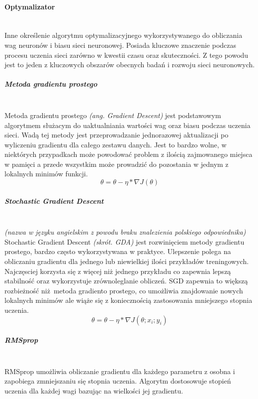 \paragraph{Optymalizator} \mbox{}\\
Inne określenie algorytmu optymalizacyjnego wykorzystywanego do obliczania wag neuronów
i biasu sieci neuronowej. Posiada kluczowe znaczenie podczas procesu uczenia sieci
zarówno w kwestii czasu oraz skuteczności. Z tego powodu jest to jeden z kluczowych
obszarów obecnych badań i rozwoju sieci neuronowych.

\subparagraph{Metoda gradientu prostego} \mbox{}\\
Metoda gradientu prostego \textit{(ang. Gradient Descent)} jest podstawowym algorytmem
służacym do uaktualniania wartości wag oraz biasu podczas uczenia sieci. Wadą tej
metody jest przeprowadzanie jednorazowej aktualizacji po wyliczeniu gradientu dla
całego zestawu danych. Jest to bardzo wolne, w niektórych przypadkach może powodować
problem z ilością zajmowanego miejsca w pamięci a przede wszystkim może prowadzić
do pozostania w jednym z lokalnych minimów funkcji.
\begin{equation}
\theta = \theta - \eta * \nabla J(\theta)
\end{equation}

\subparagraph{Stochastic Gradient Descent} \mbox{}\\
\textit{(nazwa w języku angielskim z powodu braku znalezienia polskiego odpowiednika)}
Stochastic Gradient Descent \textit{(skrót. GDA)} jest rozwinięciem metody gradientu
prostego, bardzo często wykorzystywana w praktyce. Ulepszenie polega na obliczaniu
gradientu dla jednego lub niewielkiej ilości przykładów treningowych. Najczęsciej
korzysta się z więcej niż jednego przykładu co zapewnia lepszą stabilność oraz
wykorzystuje zrównoleglanie obliczeń. SGD zapewnia to większą rozbieżność niż metoda
gradiento prostego, co umożliwia znajdowanie nowych lokalnych minimów ale wiąże się
z koniecznością zastosowania mniejszego stopnia uczenia.
\begin{equation}
\theta = \theta - \eta * \nabla J(\theta; x_i; y_i)
\end{equation}

\subparagraph{RMSprop} \mbox{}\\
RMSprop umożliwia obliczanie gradientu dla każdego parametru z osobna i zapobiega
zmniejszaniu się stopnia uczenia. Algorytm dostosowuje stopień uczenia dla każdej wagi
bazując na wielkości jej gradientu.

